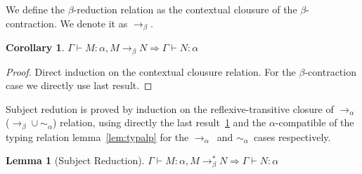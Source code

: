\documentclass{article}
\newcommand{\alp}{\ensuremath{\alpha}}
\newcommand{\betaalpha}{\ensuremath{\rightarrow_\alpha}}
\newcommand{\betaaster}{\ensuremath{\rightarrow_\beta^*}}
\newcommand{\alpeq}{\ensuremath{\sim_{\alpha}}}
\newcommand{\betaarr}{\ensuremath{\rightarrow_\beta}}
\newcommand{\type}[3]{\ensuremath{#1 \vdash #2 : #3}}
\newtheorem{lem}{Lemma}
\newtheorem{coro}{Corollary}
\begin{document}
We define the $\beta$-reduction relation as the contextual clousure of the $\beta$-contraction. We denote it as $\betaarr$.

\begin{coro} \label{lem:betred}
  $\type{\Gamma}{M}{\alpha}, M \betaarr N \Rightarrow \type{\Gamma}{N}{\alpha}$
\end{coro}

\begin{proof}
  Direct induction on the contextual clousure relation. For the $\beta$-contraction case we directly use last result.
\end{proof}

Subject redution is proved by induction on the reflexive-transitive closure of \betaalpha ($\betaarr \cup \alpeq$) relation, using directly the last result~\ref{lem:betred} and the \alp-compatible of the typing relation lemma~\ref{lem:typalp} for the \betaalpha\ and \alpeq\ cases respectively.

\begin{lem}[Subject Reduction]
  $\type{\Gamma}{M}{\alpha}, M \betaaster N \Rightarrow \type{\Gamma}{N}{\alpha}$
\end{lem}
\end{document}
